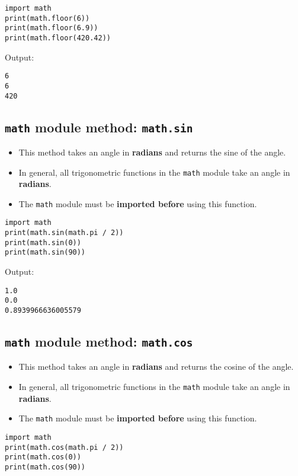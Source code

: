 \documentclass[11pt]{article}
\begin{document}
\begin{verbatim}
import math
print(math.floor(6))
print(math.floor(6.9))
print(math.floor(420.42))
\end{verbatim}

 \noindent Output:

\begin{verbatim}
6
6
420
\end{verbatim}

\subsection{\texttt{math} module method: \texttt{math.sin}}
\label{sec:org1988756}
\begin{itemize}
\item This method takes an angle in \textbf{radians} and returns the sine of the angle.
\item In general, all trigonometric functions in the \texttt{math} module take an angle in \textbf{radians}.
\item The \texttt{math} module must be \textbf{imported before} using this function.
\end{itemize}

\begin{verbatim}
import math
print(math.sin(math.pi / 2))
print(math.sin(0))
print(math.sin(90))
\end{verbatim}

 \noindent Output:

\begin{verbatim}
1.0
0.0
0.8939966636005579
\end{verbatim}

\subsection{\texttt{math} module method: \texttt{math.cos}}
\label{sec:org55ccdd3}
\begin{itemize}
\item This method takes an angle in \textbf{radians} and returns the cosine of the angle.
\item In general, all trigonometric functions in the \texttt{math} module take an angle in \textbf{radians}.
\item The \texttt{math} module must be \textbf{imported before} using this function.
\end{itemize}

\begin{verbatim}
import math
print(math.cos(math.pi / 2))
print(math.cos(0))
print(math.cos(90))
\end{verbatim}
\end{document}
